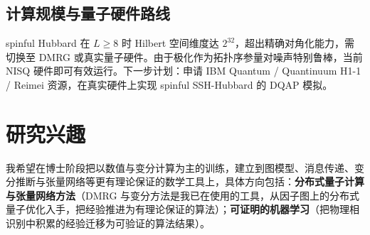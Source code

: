 \documentclass[11pt,a4paper]{article}
\begin{document}
\subsection{计算规模与量子硬件路线}

spinful Hubbard 在 $L\ge 8$ 时 Hilbert 空间维度达 $2^{32}$，超出精确对角化能力，需切换至 DMRG 或真实量子硬件。由于极化作为拓扑序参量对噪声特别鲁棒，当前 NISQ 硬件即可有效运行。下一步计划：申请 IBM Quantum / Quantinuum H1-1 / Reimei 资源，在真实硬件上实现 spinful SSH-Hubbard 的 DQAP 模拟。

\section{研究兴趣}

我希望在博士阶段把以数值与变分计算为主的训练，建立到图模型、消息传递、变分推断与张量网络等更有理论保证的数学工具上，具体方向包括：\textbf{分布式量子计算与张量网络方法}（DMRG 与变分方法是我已在使用的工具，从因子图上的分布式量子优化入手，把经验推进为有理论保证的算法）；\textbf{可证明的机器学习}（把物理相识别中积累的经验迁移为可验证的算法结果）。
\end{document}
